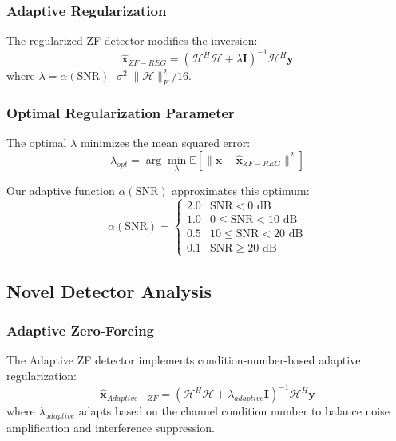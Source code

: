 \subsubsection{Adaptive Regularization}
The regularized ZF detector modifies the inversion:
\begin{equation}
\hat{\mathbf{x}}_{ZF-REG} = (\mathcal{H}^H\mathcal{H} + \lambda\mathbf{I})^{-1}\mathcal{H}^H\mathbf{y}
\end{equation}
where $\lambda = \alpha(\text{SNR}) \cdot \sigma^2 \cdot \|\mathcal{H}\|_F^2/16$.

\subsubsection{Optimal Regularization Parameter}
The optimal $\lambda$ minimizes the mean squared error:
\begin{equation}
\lambda_{opt} = \arg \min_{\lambda} \mathbb{E}\left[\|\mathbf{x} - \hat{\mathbf{x}}_{ZF-REG}\|^2\right]
\end{equation}

Our adaptive function $\alpha(\text{SNR})$ approximates this optimum:
\begin{equation}
\alpha(\text{SNR}) = \begin{cases}
2.0 & \text{SNR} < 0 \text{ dB} \\
1.0 & 0 \leq \text{SNR} < 10 \text{ dB} \\
0.5 & 10 \leq \text{SNR} < 20 \text{ dB} \\
0.1 & \text{SNR} \geq 20 \text{ dB}
\end{cases}
\end{equation}

\subsection{Novel Detector Analysis}

\subsubsection{Adaptive Zero-Forcing}
The Adaptive ZF detector implements condition-number-based adaptive regularization:
\begin{equation}
\hat{\mathbf{x}}_{Adaptive-ZF} = (\mathcal{H}^H\mathcal{H} + \lambda_{adaptive}\mathbf{I})^{-1}\mathcal{H}^H\mathbf{y}
\end{equation}
where $\lambda_{adaptive}$ adapts based on the channel condition number to balance noise amplification and interference suppression.

